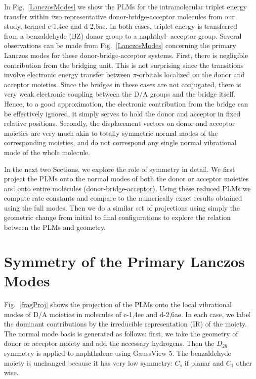 In Fig.~\ref{LanczosModes}  we show the PLMs for the
intramolecular triplet energy transfer within
two representative donor-bridge-acceptor molecules from our study, termed c-1,4ee and d-2,6ae.
In both cases, triplet energy is transferred from a benzaldehyde (BZ) donor group to a naphthyl- acceptor group.
Several observations can be made from Fig.~\ref{LanczosModes} concerning the primary Lanczos modes for these
donor-bridge-acceptor systems. First, there is negligible contribution from the bridging unit.
This is not surprising since the transitions involve  electronic energy
 transfer between $\pi$-orbitals localized on the donor and acceptor moieties.
 Since the bridges in these cases
are not conjugated, there is very weak electronic coupling between the D/A groups and the bridge itself.
Hence, to a good approximation, the electronic
contribution from the bridge can be effectively ignored, it simply serves to hold the donor and acceptor in fixed relative positions.
Secondly, the displacement vectors on donor and acceptor moieties are very much akin to  totally symmetric normal modes
of the corresponding moieties, and do not correspond any single normal vibrational  mode of the whole molecule.

In the next two Sections, we explore the role of symmetry in detail.
We first project the PLMs onto the normal modes of both the donor or acceptor moieties
and onto entire molecules (donor-bridge-acceptor).  Using these reduced PLMs we
 compute rate constants and compare to the numerically exact results obtained using the full
modes.  Then we do a similar set of projections using simply the geometric change from initial to final configurations
to explore  the relation between the PLMs and geometry.



\section{Symmetry of the Primary Lanczos Modes}

Fig.~\ref{fragProj} shows the projection of the PLMs  onto the local vibrational modes of
D/A moieties in molecules of c-1,4ee and d-2,6ae.
In each case, we label the dominant contributions by the
irreducible representation (IR) of the moiety. The normal mode basis is generated as follows:
first, we take the geometry of donor or acceptor moiety and add  the necessary hydrogens.
Then the $D_{2h}$ symmetry is applied to naphthalene using GaussView 5.
The benzaldehyde moiety is unchanged because it has very low  symmetry:  $C_{s}$ if planar and $C_{1}$  other wise.

